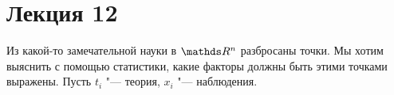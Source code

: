 \section{Лекция 12}
Из какой-то замечательной науки в $\R^n$ разбросаны точки. Мы хотим выяснить с помощью статистики, какие факторы должны быть этими точками выражены. Пусть $t_i$ "--- теория, $x_i$ "--- наблюдения. 
